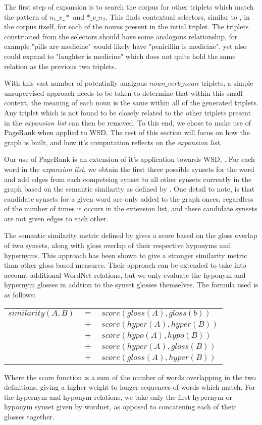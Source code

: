 \documentclass[11pt]{article}
\begin{document}
The first step of expansion is to search the corpus for other triplets which match
the pattern of $n_1\_v\_*$ and $*\_v\_n_2$.  This finds contextual
selectors, similar to \cite{schwartz08selectors}, in the corpus itself, for each of
the nouns present in the intial triplet.  The triplets constructed from the
selectors should have some analogous relationship, for example "pills are 
medicine" would likely have "penicillin is medicine", yet also could expand to
"laughter is medicine" which does not quite hold the same relation as the
previous two triplets.  

With this vast number of potentially analgous $noun\_verb\_noun$ triplets, a
simple unsupervised approach needs to be taken to determine that within this
small context, the meaning of each noun is the same
within all of the generated triplets.  Any triplet which is not found to be
closely related to the other triplets present in the \emph{expansion list} can then be
removed.  To this end, we chose to make use of PageRank when applied to
WSD.  The rest of this section will focus on how the graph is built, and how
it's computation reflects on the \emph{expansion list}.

Our use of PageRank is an extension of it's application towards WSD,
\cite{mihalcea04wsdpagerank,mihalcea06randomwalks}.  For each word in
the \emph{expansion list}, we obtain the first three possible synsets for the word and
add edges from each competeing synset to all other synsets currently in the
graph based on the semantic similarity as defined by
\cite{banerjee03extendedgloss}.  One detail to note, is that candidate synsets
for a given word are only added to the graph onces, regardless of the number of
times it occurs in the extension list, and these candidate synsets are not
given edges to each other. 

The semantic similarity metric defined by \cite{banerjee03extendedgloss} gives a
score based on the gloss overlap of two synsets, along with gloss overlap of
their respective hyponyms and hypernyms.  This approach has been shown to give a
stronger similarity metric than other gloss based measures.  Their approach can be extended to take
into account additional WordNet relations, but we only evaluate the hyponym and
hypernym glosses in addtion to the synset glosses themselves.  The formula
used is as follows:

{\small
  \begin{tabular}{lcl}    
    $similarity(A, B)$ & $=$ & $score(gloss(A), gloss(b))$ \\
    & $+$ & $score(hyper(A), hyper(B))$ \\
    & $+$ & $score(hypo(A), hypo(B))$ \\
    & $+$ & $score(hyper(A), gloss(B))$ \\
    & $+$ & $score(gloss(A), hyper(B))$  \\
  \end{tabular}
}
\normalsize
Where the score function is a sum of the number of words overlapping in the two
definitions, giving a higher weight to longer sequences of words which match.
For the hypernym and hyponym relations, we take only the first hypernym or hyponym
synset given by wordnet, as opposed to concatening each of their glosses together.  
\end{document}
